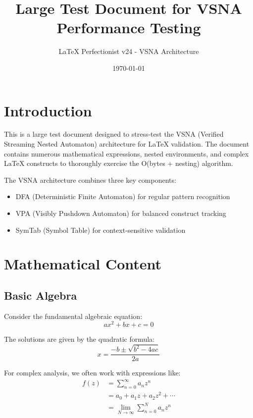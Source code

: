 \documentclass[12pt]{article}
\title{Large Test Document for VSNA Performance Testing}
\author{LaTeX Perfectionist v24 - VSNA Architecture}
\date{\today}
\begin{document}
\maketitle

\tableofcontents

\section{Introduction}

This is a large test document designed to stress-test the VSNA (Verified Streaming Nested Automaton) architecture for LaTeX validation. The document contains numerous mathematical expressions, nested environments, and complex LaTeX constructs to thoroughly exercise the O(bytes + nesting) algorithm.

The VSNA architecture combines three key components:
\begin{itemize}
\item DFA (Deterministic Finite Automaton) for regular pattern recognition
\item VPA (Visibly Pushdown Automaton) for balanced construct tracking  
\item SymTab (Symbol Table) for context-sensitive validation
\end{itemize}

\section{Mathematical Content}

\subsection{Basic Algebra}

Consider the fundamental algebraic equation:
\begin{equation}
ax^2 + bx + c = 0
\end{equation}

The solutions are given by the quadratic formula:
\begin{equation}
x = \frac{-b \pm \sqrt{b^2 - 4ac}}{2a}
\end{equation}

For complex analysis, we often work with expressions like:
\begin{align}
f(z) &= \sum_{n=0}^{\infty} a_n z^n \\
&= a_0 + a_1 z + a_2 z^2 + \cdots \\
&= \lim_{N \to \infty} \sum_{n=0}^{N} a_n z^n
\end{align}
\end{document}
